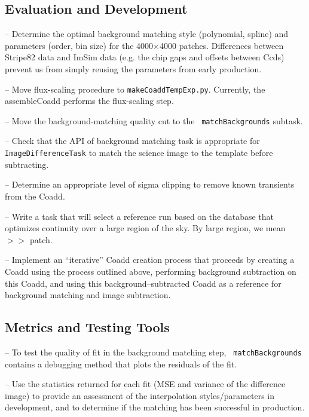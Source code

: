 \documentclass[prd, nofootinbib, floatfix, 11pt,tightenlines,times]{article}
\begin{document}
\subsection{Evaluation and Development}

-- Determine the optimal background matching style (polynomial,
spline) and parameters (order, bin size) for the 4000$\times$4000
patches. Differences between Stripe82 data and ImSim data (e.g. the
chip gaps and offsets between Ccds) prevent us from simply reusing the
parameters from early production.

-- Move flux-scaling procedure to {\tt makeCoaddTempExp.py}.
Currently, the assembleCoadd performs the flux-scaling step. 

-- Move the background-matching quality cut to the {\tt
  matchBackgrounds} subtask.

-- Check that the API of background matching task is appropriate for {\tt
  ImageDifferenceTask} to match the science image to the template
before subtracting.

-- Determine an appropriate level of sigma clipping to remove known
transients from the Coadd.

-- Write a task that will select a reference run based on the database
that optimizes continuity over a large region of the sky.  By large
region, we mean $>>$ patch.

-- Implement an ``iterative'' Coadd creation process that proceeds by
creating a Coadd using the process outlined above, performing
background subtraction on this Coadd, and using this
background--subtracted Coadd as a reference for background matching
and image subtraction.

\subsection{Metrics and Testing Tools}

-- To test the quality of fit in the background matching step, {\tt
  matchBackgrounds} contains a debugging method that plots the
residuals of the fit.

-- Use the statistics returned for each fit (MSE and variance of the
difference image) to provide an assessment of the interpolation
styles/parameters in development, and to determine if the matching has
been successful in production.
\end{document}
